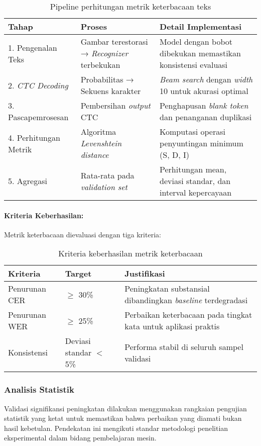 \documentclass[12pt,a4paper]{article}
\begin{document}
\begin{table}[H]
\centering
\caption{Pipeline perhitungan metrik keterbacaan teks}
\label{tab:readability-pipeline}
\small
\begin{tabular}{|l|p{5cm}|p{6cm}|}
\hline
\textbf{Tahap} & \textbf{Proses} & \textbf{Detail Implementasi} \\ \hline
1. Pengenalan Teks & Gambar terestorasi → \textit{Recognizer} terbekukan & Model dengan bobot dibekukan memastikan konsistensi evaluasi \\ \hline
2. \textit{CTC Decoding} & Probabilitas → Sekuens karakter & \textit{Beam search} dengan \textit{width} 10 untuk akurasi optimal \\ \hline
3. Pascapemrosesan & Pembersihan \textit{output} CTC & Penghapusan \textit{blank token} dan penanganan duplikasi \\ \hline
4. Perhitungan Metrik & Algoritma \textit{Levenshtein distance} & Komputasi operasi penyuntingan minimum (S, D, I) \\ \hline
5. Agregasi & Rata-rata pada \textit{validation set} & Perhitungan mean, deviasi standar, dan interval kepercayaan \\ \hline
\end{tabular}
\end{table}

\paragraph{Kriteria Keberhasilan:}
Metrik keterbacaan dievaluasi dengan tiga kriteria:

\begin{table}[H]
\centering
\caption{Kriteria keberhasilan metrik keterbacaan}
\label{tab:readability-criteria}
\small
\begin{tabular}{|l|l|p{7cm}|}
\hline
\textbf{Kriteria} & \textbf{Target} & \textbf{Justifikasi} \\ \hline
Penurunan CER & $\geq$ 30\% & Peningkatan substansial dibandingkan \textit{baseline} terdegradasi \\ \hline
Penurunan WER & $\geq$ 25\% & Perbaikan keterbacaan pada tingkat kata untuk aplikasi praktis \\ \hline
Konsistensi & Deviasi standar $<$ 5\% & Performa stabil di seluruh sampel validasi \\ \hline
\end{tabular}
\end{table}

\subsubsection{Analisis Statistik}
Validasi signifikansi peningkatan dilakukan menggunakan rangkaian pengujian statistik yang ketat untuk memastikan bahwa perbaikan yang diamati bukan hasil kebetulan. Pendekatan ini mengikuti standar metodologi penelitian eksperimental dalam bidang pembelajaran mesin.
\end{document}
